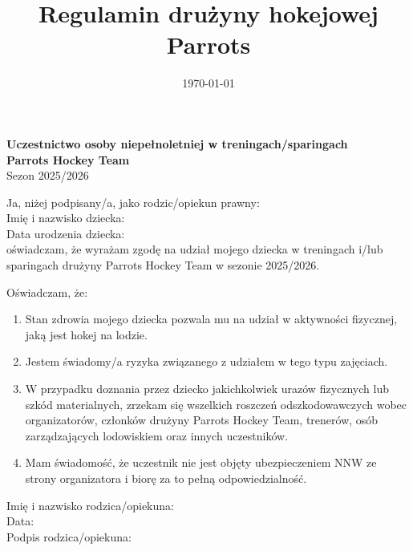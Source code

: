 \documentclass[12pt,a4paper]{article}
\title{Regulamin drużyny hokejowej Parrots}
\date{\today}
\begin{document}
\begin{center}
\textbf{Uczestnictwo osoby niepełnoletniej w treningach/sparingach}\\
\textbf{Parrots Hockey Team}\\
Sezon 2025/2026
\end{center}

\vspace{1em}

Ja, niżej podpisany/a, jako rodzic/opiekun prawny: \\[2em]

\noindent Imię i nazwisko dziecka: \dotfill \\[2em]
Data urodzenia dziecka: \dotfill \\[2em]

\noindent oświadczam, że wyrażam zgodę na udział mojego dziecka w treningach i/lub sparingach drużyny Parrots Hockey Team w sezonie 2025/2026.

\bigskip

\noindent Oświadczam, że:
\begin{enumerate}
  \item Stan zdrowia mojego dziecka pozwala mu na udział w aktywności fizycznej, jaką jest hokej na lodzie.
  \item Jestem świadomy/a ryzyka związanego z udziałem w tego typu zajęciach.
  \item W przypadku doznania przez dziecko jakichkolwiek urazów fizycznych lub szkód materialnych, zrzekam się wszelkich roszczeń odszkodowawczych wobec organizatorów, członków drużyny Parrots Hockey Team, trenerów, osób zarządzających lodowiskiem oraz innych uczestników.
  \item Mam świadomość, że uczestnik nie jest objęty ubezpieczeniem NNW ze strony organizatora i biorę za to pełną odpowiedzialność.
\end{enumerate}

\vspace{2em}

\noindent Imię i nazwisko rodzica/opiekuna: \dotfill \\[2em]
Data: \dotfill \\[2em]
Podpis rodzica/opiekuna: \dotfill
\end{document}
